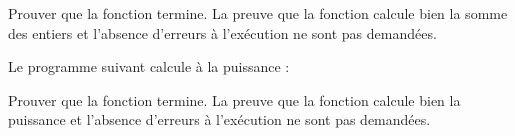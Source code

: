

Prouver que la fonction termine. La preuve que la fonction calcule bien la
somme des entiers et l'absence d'erreurs à l'exécution ne sont pas demandées.






Le programme suivant calcule  à la puissance  :




Prouver que la fonction termine. La preuve que la fonction calcule bien la
puissance et l'absence d'erreurs à l'exécution ne sont pas demandées.


